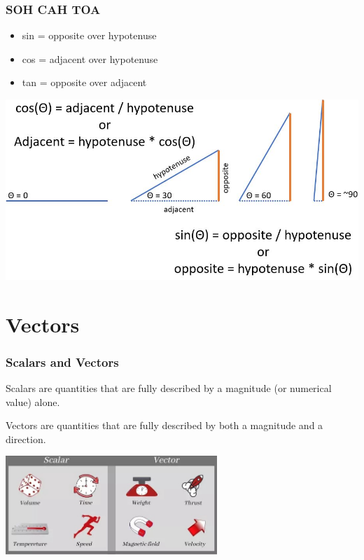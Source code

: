 \documentclass{beamer}
\begin{document}
\begin{frame}\frametitle{SOH CAH TOA}

\begin{itemize}
\item sin = opposite over hypotenuse
\item cos = adjacent over hypotenuse
\item tan = opposite over adjacent
\end{itemize}

\vspace{0.25cm}

\begin{center}
\includegraphics[scale=0.35]{fig/sohcahtoa.jpg}
\end{center}
\end{frame}

\section{Vectors}

\begin{frame}\frametitle{Scalars and Vectors}
Scalars are quantities that are fully described by a magnitude (or numerical value) alone.

Vectors are quantities that are fully described by both a magnitude and a direction.

\vspace{0.25cm}
\begin{center}
\includegraphics[width=8cm]{fig/scalarVector.jpg}
\end{center}
\end{frame}
\end{document}
